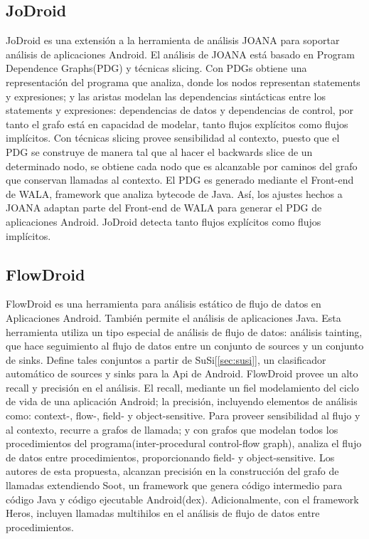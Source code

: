 \subsection{JoDroid}
\label{subsec:jod}
JoDroid\cite{JoDroid-Paper} es una extensión a la herramienta de análisis JOANA
para soportar análisis de aplicaciones Android.\newline 
El análisis de JOANA está basado en Program Dependence Graphs(PDG) y técnicas
slicing. Con PDGs obtiene una representación del programa que
analiza, donde los nodos representan statements y expresiones; y las aristas
modelan las dependencias sintácticas entre los statements y expresiones:
dependencias de datos y dependencias de control, por tanto el grafo está en
capacidad de modelar, tanto flujos explícitos como flujos implícitos.\newline
Con técnicas slicing provee sensibilidad al contexto, puesto que el PDG se
construye de manera tal que al hacer el backwards slice de un determinado nodo,
se obtiene cada nodo que es alcanzable por caminos del grafo que conservan
llamadas al contexto.\newline
El PDG es generado mediante el Front-end de WALA, framework que analiza bytecode
de Java. Así, los ajustes hechos a JOANA adaptan parte del Front-end de WALA
para generar el PDG de aplicaciones Android.\newline
JoDroid detecta tanto flujos explícitos como flujos implícitos.

\subsection{FlowDroid}
\label{subsec:FlowDroid-Tool}
FlowDroid es una herramienta para análisis estático de flujo de datos en
Aplicaciones Android. También permite el análisis de aplicaciones Java.\newline
Esta herramienta utiliza un tipo especial de análisis de flujo de datos:
análisis tainting, que hace seguimiento al flujo de datos entre un conjunto de
sources y un conjunto de sinks. Define tales conjuntos a partir de
SuSi[\ref{sec:susi}], un clasificador automático de sources y sinks para la Api
de Android.\newline 
FlowDroid provee un alto recall y precisión\cite{FlowDroid-Thesis} en el
análisis. El recall, mediante un fiel modelamiento del ciclo de vida de una
aplicación Android; la precisión, incluyendo elementos de análisis como:
context-, flow-, field- y object-sensitive. Para proveer sensibilidad al flujo y
al contexto, recurre a grafos de llamada; y con grafos que modelan todos los
procedimientos del programa(inter-procedural control-flow graph), analiza el
flujo de datos entre procedimientos, proporcionando field- y object-sensitive.\newline
Los autores de esta propuesta, alcanzan precisión en la construcción del grafo
de llamadas extendiendo Soot\cite{Soot}, un framework que genera código
intermedio para código Java y código ejecutable Android(dex). Adicionalmente,
con el framework Heros\cite{heros}, incluyen llamadas multihilos en el análisis
de flujo de datos entre procedimientos.

